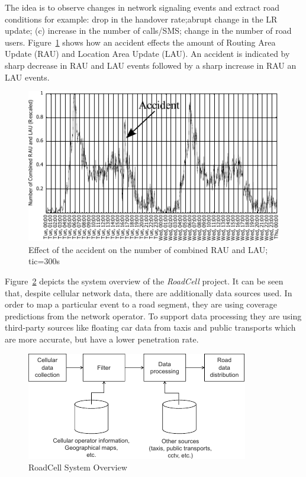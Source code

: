 The idea is to observe changes in network signaling events and extract road conditions for example: drop in the handover rate;abrupt change in the LR update; (c) increase in the number of calls/SMS; change in the number of road users. Figure~\ref{fig:raodcell_accident} shows how an accident effects the amount of Routing Area Update (RAU) and Location Area Update (LAU). An accident is indicated by sharp decrease in RAU and LAU events followed by a sharp increase in RAU an LAU events.
\begin{figure}
\centering
\includegraphics[width=0.7\linewidth]{./images/raodcell_accident}
\caption{Effect of the accident on the number of combined RAU and LAU; tic=300s \cite{Valerio20092}}
\label{fig:raodcell_accident}
\end{figure}

Figure~\ref{fig:roadcell} depicts the system overview of the \emph{RoadCell} project. It can be seen that, despite cellular network data, there are additionally data sources used. In order to map a particular event to a road segment, they are using coverage predictions from the network operator. To support data processing they are using third-party sources like floating car data from taxis and public transports which are more accurate, but have a lower penetration rate.
\begin{figure}
\centering
\includegraphics[width=0.7\linewidth]{./images/roadcell}
\caption{RoadCell System Overview \cite{Valerio2009}}
\label{fig:roadcell}
\end{figure}

